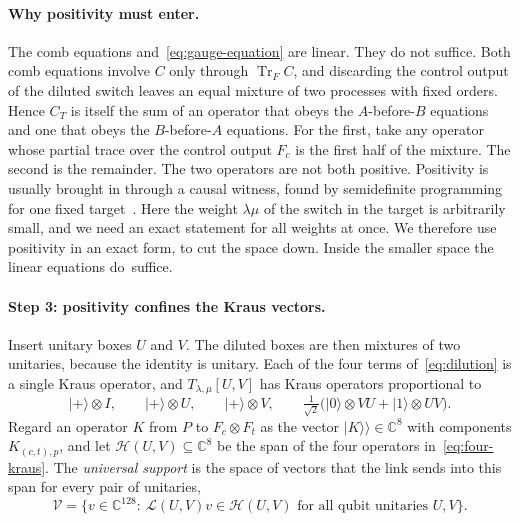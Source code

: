 \documentclass[11pt,letterpaper]{article}
\theoremstyle{definition}\newtheorem{definition}[theorem]{Definition}
\newcommand{\C}{\mathbb C}
\newcommand{\Tr}{\operatorname{Tr}}
\newcommand{\ket}[1]{\lvert#1\rangle}
\newcommand{\vket}[1]{\lvert#1\rangle\!\rangle}
\begin{document}
\paragraph{Why positivity must enter.}
The comb equations and~\eqref{eq:gauge-equation} are linear. They do
not suffice. Both comb equations involve $C$ only through $\Tr_FC$, and
discarding the control output of the diluted switch leaves an equal
mixture of two processes with fixed orders. Hence $C_T$ is itself the
sum of an operator that obeys the $A$-before-$B$ equations and one that
obeys the $B$-before-$A$ equations. For the first, take any operator
whose partial trace over the control output $F_c$ is the first half of
the mixture. The second is the remainder. The two operators are not both positive.
Positivity is usually brought in through a causal witness, found by
semidefinite programming for one fixed
target~\cite{araujo2015,bavaresco2025}. Here the weight $\lambda\mu$ of
the switch in the target is arbitrarily small, and we need an exact
statement for all weights at once. We therefore use positivity in an
exact form, to cut the space down. Inside the smaller space the linear
equations do~suffice.

\paragraph{Step 3: positivity confines the Kraus vectors.}
Insert unitary boxes $U$ and $V$. The diluted boxes are then mixtures
of two unitaries, because the identity is unitary. Each of the four
terms of~\eqref{eq:dilution} is a single Kraus operator, and
$T_{\lambda,\mu}[U,V]$ has Kraus operators proportional to
\begin{equation}\label{eq:four-kraus}
 \ket+\otimes I,\qquad \ket+\otimes U,\qquad \ket+\otimes V,\qquad
 \tfrac1{\sqrt2}\bigl(\ket0\otimes VU+\ket1\otimes UV\bigr).
\end{equation}
Regard an operator $K$ from $P$ to $F_c\otimes F_t$ as the vector
$\vket K\in\C^8$ with components $K_{(c,t),p}$, and let
$\mathcal H(U,V)\subseteq\C^8$ be the span of the four operators
in~\eqref{eq:four-kraus}. The
\emph{universal support} is the space of vectors that the link sends
into this span for every pair of unitaries,
\[
 \mathcal V=\bigl\{v\in\C^{128}:\ \mathcal L(U,V)v\in\mathcal H(U,V)
                    \text{ for all qubit unitaries }U,V\bigr\}.
\]
\end{document}
